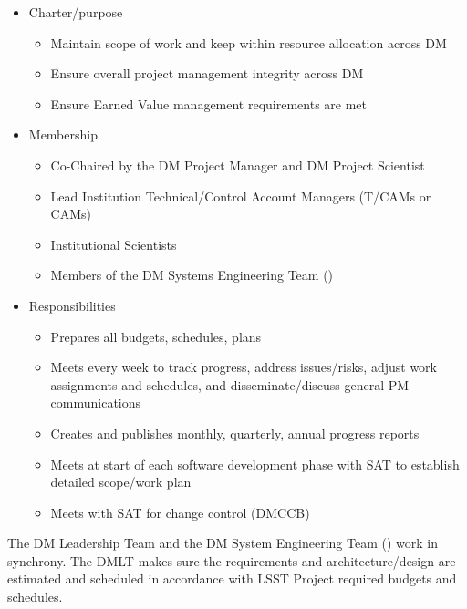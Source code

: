 \begin{itemize}
\item Charter/purpose
	\begin{itemize}
	\item Maintain scope of work and keep within resource allocation across DM
	\item Ensure overall project management integrity across DM
	\item Ensure Earned Value management requirements are met
	\end{itemize}
\item Membership
	\begin{itemize}
	\item Co-Chaired by the DM Project Manager  and  DM Project Scientist
	\item Lead Institution Technical/Control Account Managers (T/CAMs or CAMs)
	\item Institutional Scientists
	\item Members of the DM Systems Engineering Team ()
	\end{itemize}
\item Responsibilities
	\begin{itemize}
	\item Prepares all budgets, schedules, plans
	\item Meets every week to track progress, address issues/risks, adjust work assignments and schedules, and disseminate/discuss general PM communications
	\item Creates and publishes monthly, quarterly, annual progress reports
	\item Meets at start of each software development phase with SAT to establish detailed scope/work plan
	\item Meets with SAT for change control (DMCCB)
	\end{itemize}
\end{itemize}

The DM Leadership Team and the DM System Engineering Team () work in synchrony. 
The DMLT makes sure the requirements and architecture/design are estimated and scheduled in accordance with LSST Project required budgets and schedules.

